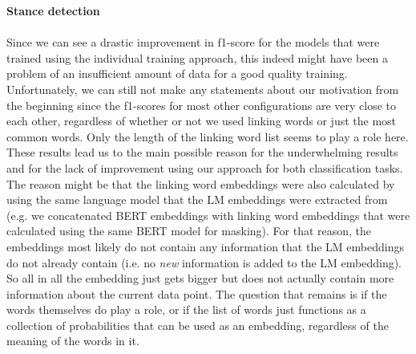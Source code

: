 \textbf{Stance detection} \\\\
Since we can see a drastic improvement in f1-score for the models that were trained using the individual training approach, this indeed might have been a problem of an insufficient amount of data for a good quality training. Unfortunately, we can still not make any statements about our motivation from the beginning since the f1-scores for most other configurations are very close to each other, regardless of whether or not we used  linking words or just the most common words. Only the length of the linking word list seems to play a role here. These results lead us to the main possible reason for the underwhelming results and for the lack of improvement using our approach for both classification tasks. The reason might be that the linking word embeddings were also calculated by using the same language model that the LM embeddings were extracted from (e.g. we concatenated BERT embeddings with linking word embeddings that were calculated using the same BERT model for masking). For that reason, the embeddings most likely do not contain any information that the LM embeddings do not already contain (i.e. no \textit{new} information is added to the LM embedding). So all in all the embedding just gets bigger but does not actually contain more information about the current data point. The question that remains is if the words themselves do play a role, or if the list of words just functions as a collection of probabilities that can be used as an embedding, regardless of the meaning of the words in it.